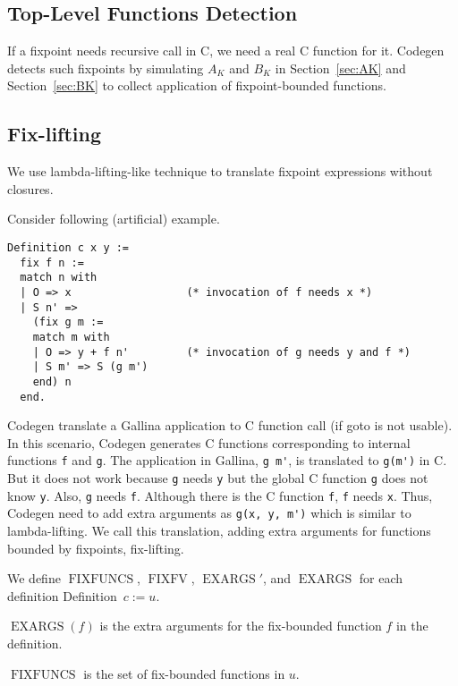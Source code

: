 \documentclass[a4paper,fleqn]{article}
\def\gallina{\textrm{Gallina}}
\def\codegen{\textrm{Codegen}}
\newcommand{\kwDefinition}{\mbox{\color{myviolet}\ttfamily Definition}}
\DeclareMathOperator{\FIXFUNCS}{FIXFUNCS}
\DeclareMathOperator{\FIXFV}{FIXFV}
\DeclareMathOperator{\EXARGS}{EXARGS}
\newcommand{\kwgoto}{\mbox{\color{myviolet}\ttfamily goto}}
\newcommand{\secref}[1]{Section~\ref{#1}}
\begin{document}
\subsection{Top-Level Functions Detection}\label{sec:top-level-function-detection}
If a fixpoint needs recursive call in C, we need a real C function for it.
\codegen{} detects such fixpoints by simulating $A_K$ and $B_K$ in \secref{sec:AK} and \secref{sec:BK} to collect application of fixpoint-bounded functions.

\subsection{Fix-lifting}\label{sec:fix-lifting}

We use lambda-lifting-like technique to translate fixpoint expressions without closures.

Consider following (artificial) example.

\begin{lstlisting}
Definition c x y :=
  fix f n :=
  match n with
  | O => x                  (* invocation of f needs x *)
  | S n' =>
    (fix g m :=
    match m with
    | O => y + f n'         (* invocation of g needs y and f *)
    | S m' => S (g m')
    end) n
  end.
\end{lstlisting}

\codegen{} translate a \gallina{} application to C function call (if \kwgoto{} is not usable).
In this scenario, \codegen{} generates C functions corresponding to internal functions \lstinline[style=Cstyle]!f! and \lstinline[style=Cstyle]!g!.
The application in \gallina{}, \lstinline!g m'!, is translated to \lstinline[style=Cstyle]!g(m')! in C.
But it does not work because \lstinline!g! needs \lstinline!y! but the global C function \lstinline[style=Cstyle]!g! does not know \lstinline!y!.
Also, \lstinline!g! needs \lstinline!f!.
Although there is the C function \lstinline!f!, \lstinline!f! needs \lstinline!x!.
Thus, \codegen{} need to add extra arguments as \lstinline[style=Cstyle]!g(x, y, m')! which is similar to lambda-lifting.
We call this translation, adding extra arguments for functions bounded by fixpoints, fix-lifting.

We define $\FIXFUNCS$, $\FIXFV$, $\EXARGS'$, and $\EXARGS$ for each definition \kwDefinition~$c := u$.

$\EXARGS(f)$ is the extra arguments for the fix-bounded function $f$ in the definition.

$\FIXFUNCS$ is the set of fix-bounded functions in $u$.
\end{document}
